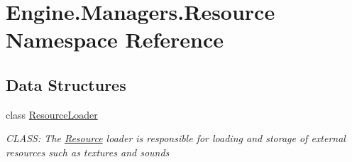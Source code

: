 \hypertarget{a00272}{}\section{Engine.\+Managers.\+Resource Namespace Reference}
\label{a00272}
\subsection*{Data Structures}
\begin{DoxyCompactItemize}
\item 
class \hyperlink{a00530}{Resource\+Loader}
\begin{DoxyCompactList}\small\item\em C\+L\+A\+SS\+: The \hyperlink{a00272}{Resource} loader is responsible for loading and storage of external resources such as textures and sounds \end{DoxyCompactList}\end{DoxyCompactItemize}
